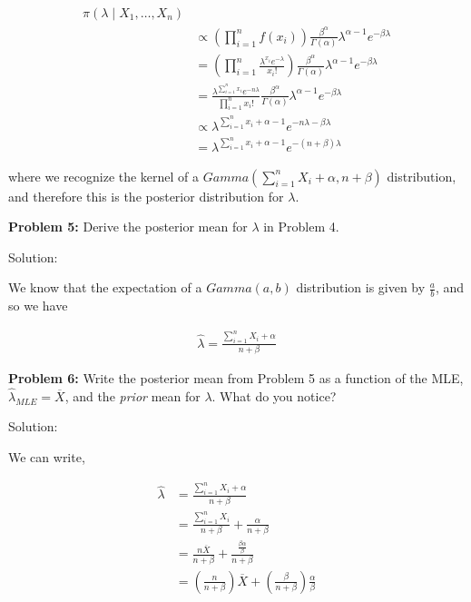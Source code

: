 \documentclass[
  letterpaper,
  DIV=11,
  numbers=noendperiod]{scrreprt}
\begin{document}
\begin{align*}
    \pi(\lambda \mid X_1, \dots, X_n) \\
    & \propto \left( \prod_{i = 1}^n f(x_i) \right) \frac{\beta^\alpha}{\Gamma(\alpha)} \lambda^{\alpha - 1} e^{-\beta \lambda} \\
    & = \left( \prod_{i = 1}^n \frac{\lambda^{x_i} e^{-\lambda}}{x_i!} \right) \frac{\beta^\alpha}{\Gamma(\alpha)} \lambda^{\alpha - 1} e^{-\beta \lambda} \\
    & = \frac{\lambda^{\sum_{i = 1}^n x_i}e^{-n\lambda}}{\prod_{i = 1}^n x_i!} \frac{\beta^\alpha}{\Gamma(\alpha)} \lambda^{\alpha - 1} e^{-\beta \lambda} \\
    & \propto \lambda^{\sum_{i = 1}^n x_i + \alpha - 1} e^{-n\lambda - \beta \lambda} \\
    & = \lambda^{\sum_{i = 1}^n x_i + \alpha - 1} e^{-(n + \beta)\lambda} 
\end{align*}

where we recognize the kernel of a
\(Gamma(\sum_{i = 1}^n X_i + \alpha, n + \beta)\) distribution, and
therefore this is the posterior distribution for \(\lambda\).

\textbf{Problem 5:} Derive the posterior mean for \(\lambda\) in Problem
4.

Solution:

We know that the expectation of a \(Gamma(a, b)\) distribution is given
by \(\frac{a}{b}\), and so we have

\begin{align*}
    \hat{\lambda} = \frac{\sum_{i = 1}^n X_i + \alpha}{n + \beta}
\end{align*}

\textbf{Problem 6:} Write the posterior mean from Problem 5 as a
function of the MLE, \(\hat{\lambda}_{MLE} = \overline{X}\), and the
\emph{prior} mean for \(\lambda\). What do you notice?

Solution:

We can write,

\begin{align*}
    \hat{\lambda} & = \frac{\sum_{i = 1}^n X_i + \alpha}{n + \beta} \\
    & = \frac{\sum_{i = 1}^n X_i}{n + \beta} + \frac{\alpha}{n + \beta} \\
    & = \frac{n \overline{X}}{n + \beta} + \frac{\frac{\beta\alpha}{\beta}}{n + \beta} \\
    & = \left( \frac{n}{n + \beta}  \right) \overline{X} + \left( \frac{\beta}{n + \beta} \right) \frac{\alpha}{\beta}
\end{align*}
\end{document}

